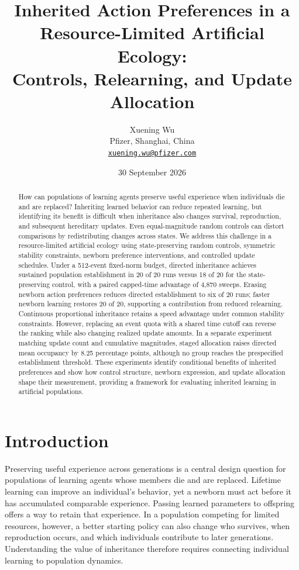 \documentclass[11pt]{article}
\title{Inherited Action Preferences in a Resource-Limited Artificial Ecology:\\Controls, Relearning, and Update Allocation}
\author{Xuening Wu\\Pfizer, Shanghai, China\\\small\href{mailto:xuening.wu@pfizer.com}{\texttt{xuening.wu@pfizer.com}}}
\date{30 September 2026}
\begin{document}
\maketitle
\begin{abstract}
How can populations of learning agents preserve useful experience when individuals die and are replaced? Inheriting learned behavior can reduce repeated learning, but identifying its benefit is difficult when inheritance also changes survival, reproduction, and subsequent hereditary updates. Even equal-magnitude random controls can distort comparisons by redistributing changes across states. We address this challenge in a resource-limited artificial ecology using state-preserving random controls, symmetric stability constraints, newborn preference interventions, and controlled update schedules. Under a 512-event fixed-norm budget, directed inheritance achieves sustained population establishment in 20 of 20 runs versus 18 of 20 for the state-preserving control, with a paired capped-time advantage of 4,870 sweeps. Erasing newborn action preferences reduces directed establishment to six of 20 runs; faster newborn learning restores 20 of 20, supporting a contribution from reduced relearning. Continuous proportional inheritance retains a speed advantage under common stability constraints. However, replacing an event quota with a shared time cutoff can reverse the ranking while also changing realized update amounts. In a separate experiment matching update count and cumulative magnitudes, staged allocation raises directed mean occupancy by 8.25 percentage points, although no group reaches the prespecified establishment threshold. These experiments identify conditional benefits of inherited preferences and show how control structure, newborn expression, and update allocation shape their measurement, providing a framework for evaluating inherited learning in artificial populations.
\end{abstract}

\section{Introduction}
Preserving useful experience across generations is a central design question for populations of learning agents whose members die and are replaced. Lifetime learning can improve an individual's behavior, yet a newborn must act before it has accumulated comparable experience. Passing learned parameters to offspring offers a way to retain that experience. In a population competing for limited resources, however, a better starting policy can also change who survives, when reproduction occurs, and which individuals contribute to later generations. Understanding the value of inheritance therefore requires connecting individual learning to population dynamics.
\end{document}
